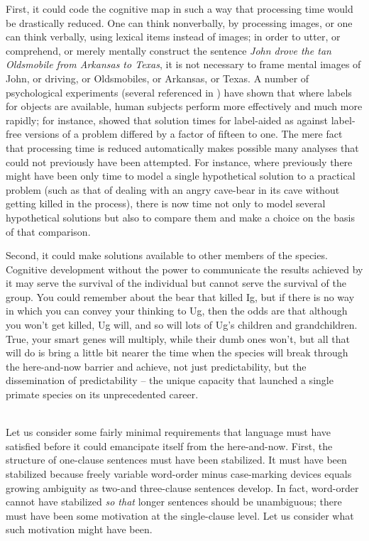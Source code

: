 First, it could code the cognitive map in such a way that processing time would be drastically reduced. One can think nonverbally, by processing images, or one can think verbally, using lexical items instead of images; in order to utter, or comprehend, or merely mentally construct the sentence \textit{John drove the tan Oldsmobile from Arkansas to Texas}, it is not necessary to frame mental images of John, or driving, or Oldsmobiles, or Arkansas, or Texas. A number of psychological experi\-ments (several referenced in \citealt{Hamilton1974}) have shown that where labels for objects are available, human subjects perform more effec\-tively and much more rapidly; for instance, \citet{GlucksbergEtAl1966} showed that solution times for label-aided as against label-free versions of a problem differed by a factor of fifteen to one. The mere fact that processing time is reduced automatically makes possible many analyses that could not previously have been attempted. For instance, where previously there might have been only time to model a single hypothetical solution to a practical problem (such as that of dealing with an angry cave-bear in its cave without getting killed in the process), there is now time not only to model several hypothetical solutions but also to compare them and make a choice on the basis of that comparison.

Second, it could make solutions available to other members of the species. Cognitive development without the power to communicate the results achieved by it may serve the survival of the individual but cannot serve the survival of the group. You could remember about the bear that killed Ig, but if there is no way in which you can convey your thinking to Ug, then the odds are that although you won't get killed, Ug will, and so will lots of Ug's children and grandchildren. True, your smart genes will multiply, while their dumb ones won't, but all that will do is bring a little bit nearer the time when the species will break through the here-and-now barrier and achieve, not just
predictability, but the dissemination of predictability -- the unique capacity that launched a single primate species on its unprecedented career.\\\\

Let us consider some fairly minimal requirements that language  must have satisfied before it could emancipate itself from the here-and-now. First, the structure of one-clause sentences must have been stabilized. It must have been stabilized because freely variable word-order minus case-marking devices equals growing ambiguity as two-and three-clause sentences develop. In fact, word-order cannot have stabilized \textit{so that} longer sentences should be unambiguous; there must have been some motivation at the single-clause level. Let us consider what such motivation might have been.

